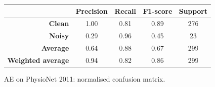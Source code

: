 \documentclass[a4paper,10pt]{article}
\begin{document}
\begin{figure}[p]
{\begin{minipage}{0.6\textwidth}
			\caption{AE on PhysioNet 2011: normalised confusion matrix.}%
			\label{fig:feature_phynet_cm}
		\end{minipage}
	}
	\baselineskip
	\begin{tabular}{r|c|c|c|c}
		                          & \textbf{Precision} & \textbf{Recall} & \textbf{F1-score} & \textbf{Support} \\ \midrule
		\textbf{Clean}            & 1.00               & 0.81            & 0.89              & 276              \\
		\textbf{Noisy}            & 0.29               & 0.96            & 0.45              & 23               \\ \midrule
		\textbf{Average}          & 0.64               & 0.88            & 0.67              & 299              \\
		\textbf{Weighted average} & 0.94               & 0.82            & 0.86              & 299
	\end{tabular}
	\label{tab:feature_phynet_cr}
\end{figure}

\begin{figure}[p]
\end{figure}
\end{document}

